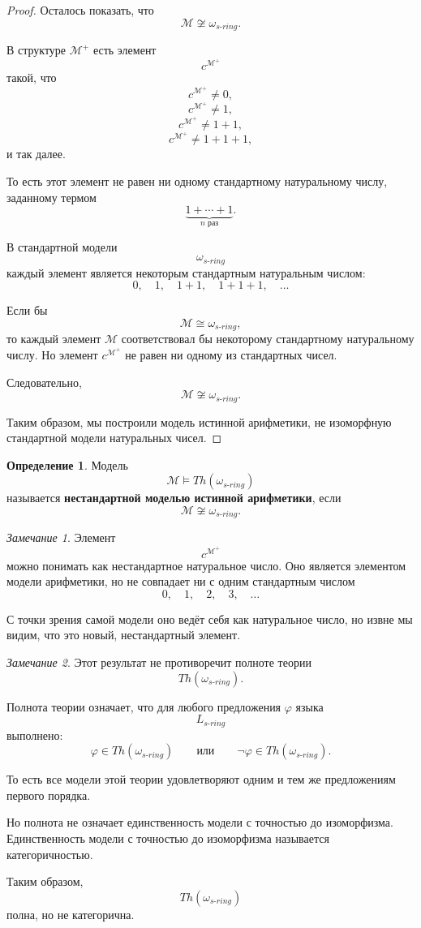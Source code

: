 \documentclass[12pt,a4paper,oneside,openany]{book}
\theoremstyle{definition}
\newtheorem{definition}{Определение}[chapter]
\theoremstyle{plain}
\theoremstyle{remark}
\newtheorem{remark}{Замечание}[chapter]
\begin{document}
\begin{proof}
Осталось показать, что
\[
\mathcal M\not\cong \omega_{s\text{-}ring}.
\]

В структуре $\mathcal M^+$ есть элемент
\[
c^{\mathcal M^+}
\]
такой, что
\[
c^{\mathcal M^+}\ne 0,
\]
\[
c^{\mathcal M^+}\ne 1,
\]
\[
c^{\mathcal M^+}\ne 1+1,
\]
\[
c^{\mathcal M^+}\ne 1+1+1,
\]
и так далее.

То есть этот элемент не равен ни одному стандартному натуральному числу, заданному термом
\[
\underbrace{1+\cdots+1}_{n\text{ раз}}.
\]

В стандартной модели
\[
\omega_{s\text{-}ring}
\]
каждый элемент является некоторым стандартным натуральным числом:
\[
0,\quad 1,\quad 1+1,\quad 1+1+1,\quad \ldots
\]

Если бы
\[
\mathcal M\cong \omega_{s\text{-}ring},
\]
то каждый элемент $\mathcal M$ соответствовал бы некоторому стандартному натуральному числу. Но элемент $c^{\mathcal M^+}$ не равен ни одному из стандартных чисел.

Следовательно,
\[
\mathcal M\not\cong \omega_{s\text{-}ring}.
\]

Таким образом, мы построили модель истинной арифметики, не изоморфную стандартной модели натуральных чисел.
\end{proof}

\begin{definition}
Модель
\[
\mathcal M\models Th(\omega_{s\text{-}ring})
\]
называется \textbf{нестандартной моделью истинной арифметики}, если
\[
\mathcal M\not\cong \omega_{s\text{-}ring}.
\]
\end{definition}

\begin{remark}
Элемент
\[
c^{\mathcal M^+}
\]
можно понимать как нестандартное натуральное число. Оно является элементом модели арифметики, но не совпадает ни с одним стандартным числом
\[
0,\quad 1,\quad 2,\quad 3,\quad \ldots
\]

С точки зрения самой модели оно ведёт себя как натуральное число, но извне мы видим, что это новый, нестандартный элемент.
\end{remark}

\begin{remark}
Этот результат не противоречит полноте теории
\[
Th(\omega_{s\text{-}ring}).
\]

Полнота теории означает, что для любого предложения $\varphi$ языка
\[
L_{s\text{-}ring}
\]
выполнено:
\[
\varphi\in Th(\omega_{s\text{-}ring})
\qquad
\text{или}
\qquad
\neg\varphi\in Th(\omega_{s\text{-}ring}).
\]

То есть все модели этой теории удовлетворяют одним и тем же предложениям первого порядка.

Но полнота не означает единственность модели с точностью до изоморфизма. Единственность модели с точностью до изоморфизма называется категоричностью.

Таким образом,
\[
Th(\omega_{s\text{-}ring})
\]
полна, но не категорична.
\end{remark}
\end{document}

